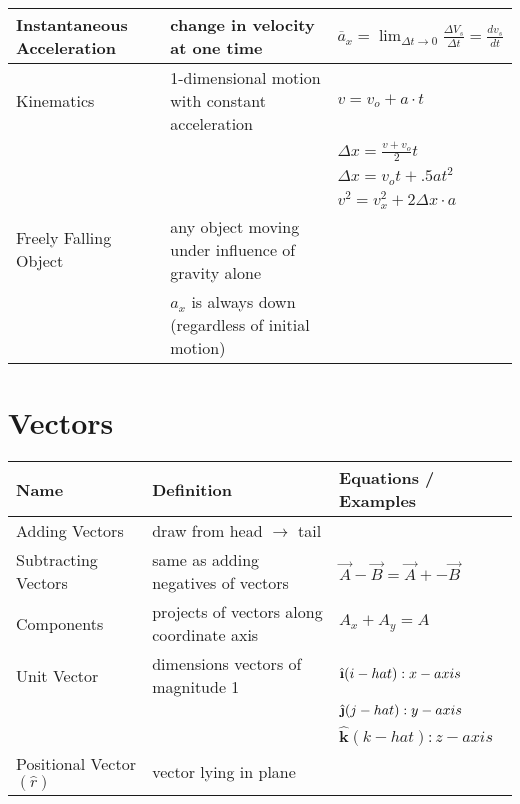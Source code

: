 \documentclass[11pt]{article}
\newcommand{\ihat}{\hat{\textbf{\i}}}
\newcommand{\jhat}{\hat{\textbf{\j}}}
\newcommand{\khat}{\hat{\textbf{k}}}
\begin{document}
\begin{tabularx}{\textwidth}{l| X l}
    Instantaneous Acceleration & change in velocity at one time                                           & $ \overline{a}_{x} = \lim_{\Delta t \to 0} \frac{\Delta V_{s}}{\Delta t} = \frac{dv_{s}}{dt} $ \bigstrut \\ \hline
    Kinematics                 & 1-dimensional motion with constant acceleration                          & $ v= v_{o} + a \cdot t $ \\*                                                                                       &  & $ \Delta x = \frac{v + v_{o}}{2}t $ \\* &  & $ \Delta x = v_{o}t + .5at^{2} $ \\* &  & $ v^{2} = v^{2}_{x}+ 2\Delta x \cdot a$ \bigstrut \\ \hline
    Freely Falling Object      & any object moving under influence of gravity alone \\*                   & $ a_{x} $ is always down (regardless of initial motion) \\ \hline
\end{tabularx}

\section{Vectors}
\begin{tabularx}{\textwidth}{l| X l}
    Name                            & Definition                                & Equations / Examples \\ \hline
    Adding Vectors                  & draw from head $ \to $ tail \\ \hline
    Subtracting Vectors             & same as adding negatives of vectors       & $ \vec{A} - \vec{B} = \vec{A} + - \vec{B} $ \bigstrut \\ \hline
    Components                      & projects of vectors along coordinate axis & $ A_{x} + A_{y} = A $ \bigstrut \\ \hline
    Unit Vector                     & dimensions vectors of magnitude 1         & $ \ihat (i-hat) : x-axis $ \\* &  & $ \jhat (j-hat): y-axis $ \\* &  & $ \khat (k-hat): z-axis $ \bigstrut \\ \hline
    Positional Vector $ (\hat{r}) $ & vector lying in plane                     &
\end{tabularx}
\end{document}
